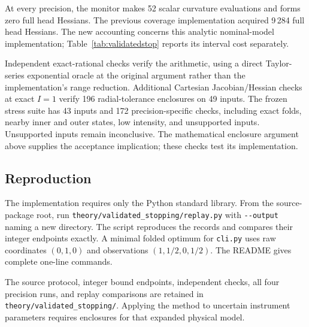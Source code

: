 At every precision, the monitor makes 52 scalar curvature evaluations and forms zero full head Hessians. The previous coverage implementation acquired 9\,284 full head Hessians. The new accounting concerns this analytic nominal-model implementation; Table~\ref{tab:validatedstop} reports its interval cost separately.

Independent exact-rational checks verify the arithmetic, using a direct Taylor-series exponential oracle at the original argument rather than the implementation's range reduction. Additional Cartesian Jacobian/Hessian checks at exact $I=1$ verify 196 radial-tolerance enclosures on 49 inputs. The frozen stress suite has 43 inputs and 172 precision-specific checks, including exact folds, nearby inner and outer states, low intensity, and unsupported inputs. Unsupported inputs remain inconclusive. The mathematical enclosure argument above supplies the acceptance implication; these checks test its implementation.

\subsection{Reproduction}
The implementation requires only the Python standard library. From the source-package root, run \nolinkurl{theory/validated_stopping/replay.py} with \nolinkurl{--output} naming a new directory. The script reproduces the records and compares their integer endpoints exactly. A minimal folded optimum for \nolinkurl{cli.py} uses raw coordinates $(0,1,0)$ and observations $(1,1/2,0,1/2)$. The README gives complete one-line commands.

The source protocol, integer bound endpoints, independent checks, all four precision runs, and replay comparisons are retained in \nolinkurl{theory/validated_stopping/}. Applying the method to uncertain instrument parameters requires enclosures for that expanded physical model.
